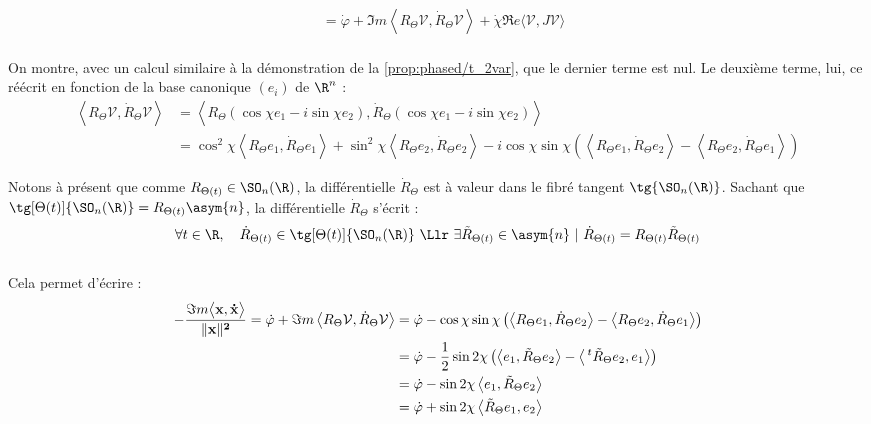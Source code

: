 \begin{demo}
\begin{align*}
			&= \dot{\varphi} + \Im m \left\langle R_\Theta \mathcal{V},   \dot{R}_{\Theta}\mathcal{V}\right\rangle + \dot{\chi} \Re e \big\langle \mathcal{V}, J\mathcal{V}\big\rangle
	\end{align*}
	\\
	On montre, avec un calcul similaire à la démonstration de la \cref{prop:phased/t_2var}, que le dernier terme est nul. Le deuxième terme, lui, ce réécrit en fonction de la base canonique $(e_i)$ de $\R^n$ :
	\begin{align*}
		\left\langle R_\Theta \mathcal{V},   \dot{R}_{\Theta}\mathcal{V}\right\rangle 
		&= \left\langle R_\Theta (\cos\chi e_1 -i\sin\chi e_2),   \dot{R}_{\Theta}(\cos\chi e_1 -i\sin\chi e_2)\right\rangle  \\
		&= \cos^2\chi \left\langle R_\Theta  e_1 ,   \dot{R}_{\Theta}e_1\right\rangle  + \sin^2\chi \left\langle R_\Theta e_2,   \dot{R}_{\Theta}e_2\right\rangle  
		- i \cos\chi  \sin\chi \left(\left\langle R_\Theta e_1,   \dot{R}_{\Theta} e_2\right\rangle - \left\langle R_\Theta e_2,   \dot{R}_{\Theta}e_1 \right\rangle\right) 
	\end{align*}

	Notons à présent que comme $R_{\Theta(t)}\in\SO_n(\R)$, la différentielle $\dot{R}_{\Theta}$ est à valeur dans le fibré tangent $\tg{\SO_n(\R)}$. Sachant que $\tg[\Theta(t)]{\SO_n(\R)} = R_{\Theta(t)}\asym{n}$, la différentielle $\dot{R}_\Theta$ s'écrit :
	\[\forall t\in\R,\quad \dot{R}_{\Theta(t)}\in \tg[\Theta(t)]{\SO_n(\R)}\ \Llr\ \exists \Tilde{R}_{\Theta(t)}\in\asym{n}\ |\ \dot{R}_{\Theta(t)} = R_{\Theta(t)} \Tilde{R}_{\Theta(t)}\]
	\\
	Cela permet d'écrire :
	\begin{align*}
		-\frac{\Im m\big\langle \bf{x},\dot{\bf{x}}\big\rangle}{\|\bf{x}\|^2} = \dot{\varphi} + \Im m \left\langle R_\Theta \mathcal{V},   \dot{R}_{\Theta}\mathcal{V}\right\rangle %
		&= \dot{\varphi} -  \cos\chi \sin\chi \left(\left\langle R_\Theta e_1,   \dot{R}_{\Theta} e_2\right\rangle - \left\langle R_\Theta e_2,   \dot{R}_{\Theta}e_1 \right\rangle\right) \\
		&= \dot{\varphi} - \frac{1}{2} \sin2\chi \left(\left\langle e_1,   \Tilde{R}_{\Theta} e_2\right\rangle - \left\langle \, ^t\Tilde{R}_\Theta e_2, e_1 \right\rangle\right) \\
		&= \dot{\varphi} - \sin2\chi \left\langle e_1, \Tilde{R}_{\Theta} e_2\right\rangle \\
		&= \dot{\varphi} + \sin2\chi \left\langle \Tilde{R}_{\Theta} e_1,  e_2\right\rangle
	\end{align*}
\end{demo}


